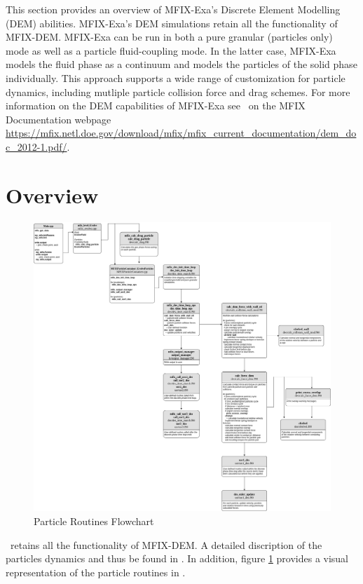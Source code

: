 This section provides an overview of MFIX-Exa's Discrete Element Modelling (DEM)
abilities. MFIX-Exa's DEM simulations retain all the functionality of MFIX-DEM. 
MFIX-Exa can be run in both a pure granular (particles only) mode  
as well as a particle fluid-coupling mode. In the latter case, MFIX-Exa models 
the fluid phase as a continuum and models the
particles of the solid phase individually. This approach supports a wide range 
of customization for particle dynamics, including mutliple particle collision 
force and drag schemes. For more information on the DEM capabilities of MFIX-Exa
see \demdoc\ on the MFIX Documentation webpage 
{\url{https://mfix.netl.doe.gov/download/mfix/mfix_current_documentation/dem_doc_2012-1.pdf/}}.  

\section{Overview}

\begin{figure}
    \includegraphics[width=\linewidth,natwidth=800, natheight=600]{./Particles/MFIX-Particle-Diagram.png} 
    \caption{Particle Routines Flowchart}
    \label{fig:pflowchart}
\end{figure}

\mfix\ retains all the functionality of MFIX-DEM. A detailed discription of the
particles dynamics and thus be found in \demdoc.
In addition, figure \ref{fig:pflowchart} provides a visual representation
of the particle routines in \mfix. 

